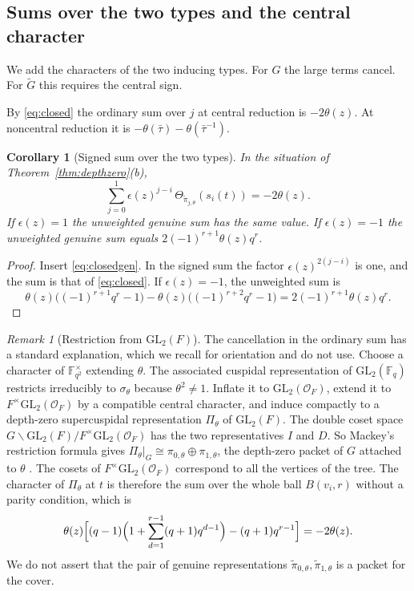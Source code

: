 \documentclass[12pt,letterpaper]{article}
\numberwithin{equation}{section}
\newtheorem{corollary}[theorem]{Corollary}
\theoremstyle{definition}
\theoremstyle{remark}
\newtheorem{remark}[theorem]{Remark}
\newcommand{\OO}{\mathcal O_F}
\newcommand{\kk}{\mathbb F_q}
\newcommand{\Gt}{\widetilde G}
\newcommand{\sgn}{\epsilon}
\begin{document}
\subsection*{Sums over the two types and the central character}
We add the characters of the two inducing types. For $G$ the large terms cancel. For $\Gt$ this requires the central sign.

By \eqref{eq:closed} the ordinary sum over $j$ at central reduction is $-2\theta(z)$. At noncentral reduction it is $-\theta(\bar\tau)-\theta(\bar\tau^{-1})$.

\begin{corollary}[Signed sum over the two types]\label{cor:sum}
In the situation of Theorem~\ref{thm:depthzero}(b),
\[
 \sum_{j=0}^1\sgn(z)^{j-i}\,
 \Theta_{\widetilde\pi_{j,\theta}}(s_i(t))=-2\theta(z).
\]
If $\sgn(z)=1$ the unweighted genuine sum has the same value. If $\sgn(z)=-1$ the unweighted genuine sum equals $2(-1)^{r+1}\theta(z)q^r$.
\end{corollary}
\begin{proof}
Insert \eqref{eq:closedgen}. In the signed sum the factor $\sgn(z)^{2(j-i)}$ is one, and the sum is that of \eqref{eq:closed}. If $\sgn(z)=-1$, the unweighted sum is
\[
 \theta(z)\bigl((-1)^{r+1}q^r-1\bigr)-\theta(z)\bigl((-1)^{r+2}q^r-1\bigr)=2(-1)^{r+1}\theta(z)q^r .
\]
\end{proof}

\begin{remark}[Restriction from $\mathrm{GL}_2(F)$]\label{rem:gl2}
The cancellation in the ordinary sum has a standard explanation, which we recall for orientation and do not use. Choose a character of $\mathbb F_{q^2}^\times$ extending $\theta$. The associated cuspidal representation of $\mathrm{GL}_2(\kk)$ restricts irreducibly to $\sigma_\theta$ because $\theta^2\ne1$. Inflate it to $\mathrm{GL}_2(\OO)$, extend it to $F^\times\mathrm{GL}_2(\OO)$ by a compatible central character, and induce compactly to a depth-zero supercuspidal representation $\Pi_\theta$ of $\mathrm{GL}_2(F)$. The double coset space $G\backslash\mathrm{GL}_2(F)/F^\times\mathrm{GL}_2(\OO)$ has the two representatives $I$ and $D$. So Mackey's restriction formula gives $\Pi_\theta|_G\cong\pi_{0,\theta}\oplus\pi_{1,\theta}$, the depth-zero packet of $G$ attached to $\theta$ \cite{AP24}. The cosets of $F^\times\mathrm{GL}_2(\OO)$ correspond to all the vertices of the tree. The character of $\Pi_\theta$ at $t$ is therefore the sum over the whole ball $B(v_i,r)$ without a parity condition, which is
\[
 \theta(z)\Bigl[(q-1)\Bigl(1+\sum_{d=1}^{r-1}(q+1)q^{d-1}\Bigr)-(q+1)q^{r-1}\Bigr]=-2\theta(z).
\]
We do not assert that the pair of genuine representations $\widetilde\pi_{0,\theta},\widetilde\pi_{1,\theta}$ is a packet for the cover.
\end{remark}
\end{document}
